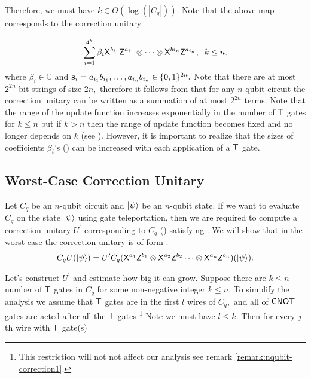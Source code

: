 Therefore, we must have $k\in O(\log(|C_q|)).$ Note that the above map corresponds to the correction unitary 

 \begin{equation}
\label{exp:nqubit-correction}
\sum_{i=1}^{4^k} \beta_i {\sf X}^{b_{i_1}} {\sf Z}^{a_{i_1}}\otimes \cdots \otimes {\sf X}^{b{i_n}} {\sf Z}^{a_{i_n}},\;  \; k\leq n.
\end{equation}
where $\beta_i\in\mathbb{C}$ and ${\bf s}_i=a_{i_1}b_{i_1}, \ldots, a_{i_n}b_{i_n} \in\{0,1\}^{2n}.$  Note that there are at most $2^{2n}$ bit strings of size $2n,$ therefore it follows from  that for any $n$-qubit circuit the correction unitary can be written as a summation of at most $2^{2n}$ terms. Note that the range of the update function increases exponentially in the number of ${\sf T}$ gates for $k\leq n$ but if $k>n$ then the range of update function becomes fixed and no longer depends on $k$ (see ). However, it is important to realize that the sizes of coefficients $\beta_i$'s () can be increased with each application of a ${\sf T}$ gate.

\subsection{Worst-Case Correction Unitary}
Let $C_q$ be an $n$-qubit circuit and ${\lvert}\psi\rangle$ be an $n$-qubit state. If we want to evaluate $C_q$ on the state ${\lvert}\psi\rangle$ using gate teleportation, then we are required to compute a correction unitary $U^\prime$ corresponding to $C_q$ () satisfying . We will show that in the worst-case the correction unitary is of form .
\begin{equation}
\label{nqubit:eq6}
C_qU({\lvert}\psi\rangle)= U^\prime C_q ({\sf X}^{a_{1}}{\sf Z}^{b_{1}}\otimes {\sf X}^{a_{2}}{\sf Z}^{b_{2}}\cdots \otimes {\sf X}^{a_{n}}{\sf Z}^{b_{n}})({\lvert}\psi\rangle).
\end{equation}

Let's construct $U^\prime$ and estimate how big it can grow. Suppose there are $k\leq n$ number of ${\sf T}$ gates in $C_q$ for some non-negative integer $k\leq n.$ To simplify the analysis we assume that ${\sf T}$ gates are in the first $l$ wires of $C_q,$ and all of ${\sf CNOT}$ gates are acted after all the ${\sf T}$ gates \footnote{This restriction will not not affect our analysis see remark \cref{remark:nqubit-correction1}.} Note we must have $l\leq k.$ Then for every $j$-th wire with ${\sf T}$ gate(s)

